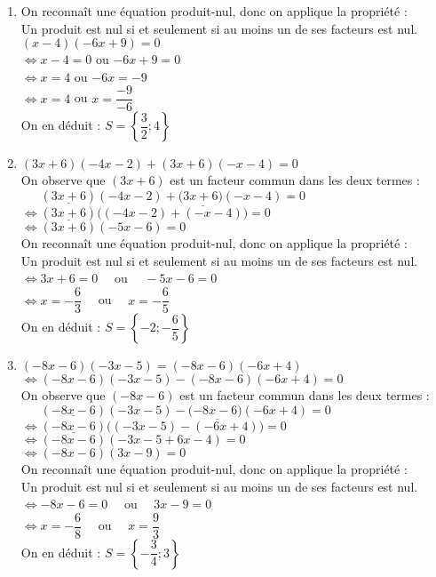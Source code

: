 \documentclass[a4paper,11pt,exos]{nsi} %
\begin{document}
\begin{enumerate}
    \item On reconnaît une équation produit-nul, donc on applique la propriété :\\
        {\color[HTML]{f15929}Un produit est nul si et seulement si au moins un de ses facteurs est nul.}\\$(x-4)(-6x+9)=0$\\$\iff x-4=0$ ou $-6x+9=0$\\$\iff x=4$ ou $ -6x=-9$\\$\iff x=4$ ou $ x=\dfrac{-9}{-6}$\\On en déduit :  $S=\left\{\dfrac{3}{2};4\right\}$
    \item  $(3x+6)( -4x-2)+(3x+6)(-x-4)=0$\\ On observe que $(3x+6)$ est un facteur commun dans les deux termes :\\ $\phantom{\iff} (\underline{3x+6})( -4x-2)+(\underline{3x+6)}( -x-4)=0$\\ $\iff (\underline{3x+6})\Big(( -4x-2)+(-x-4)\Big)=0$\\ $\iff (3x+6)( -5x-6)=0$\\On reconnaît une équation produit-nul, donc on applique la propriété :\\{\color[HTML]{f15929}Un produit est nul si et seulement si au moins un de ses facteurs est nul.}\\ $\iff 3x+6=0\quad$ ou $\quad -5x-6=0$\\$\iff x=-\dfrac{6}{3}\quad$ ou $\quad x=-\dfrac{6}{5}$\\
                    On en déduit :  $S=\left\{-2;-\dfrac{6}{5}\right\}$
    \item  $(-8x-6)( -3x-5)=( -8x-6)( -6x+4)$\\ 
    $\iff (-8x-6)(-3x-5)-(-8x-6)(-6x+4)=0$\\
    On observe que $(-8x-6)$ est un facteur commun dans les deux termes :\\ $\phantom{\iff} (\underline{-8x-6})( -3x-5)- (\underline{-8x-6)}( -6x+4)=0$\\ $\iff (\underline{-8x-6})\Big(( -3x-5)-( -6x+4)\Big)=0$\\ $\iff (-8x-6)( -3x-5+6x-4)=0$\\ $\iff (-8x-6)( 3x-9)=0$\\On reconnaît une équation produit-nul, donc on applique la propriété :\\{\color[HTML]{f15929}Un produit est nul si et seulement si au moins un de ses facteurs est nul.}\\ $\iff -8x-6=0\quad$ ou $\quad 3x-9=0$\\$\iff x=-\dfrac{6}{8}\quad$ ou $\quad x=\dfrac{9}{3}$\\
                On en déduit :  $S=\left\{-\dfrac{3}{4};3\right\}$
\end{enumerate}
\end{document}
